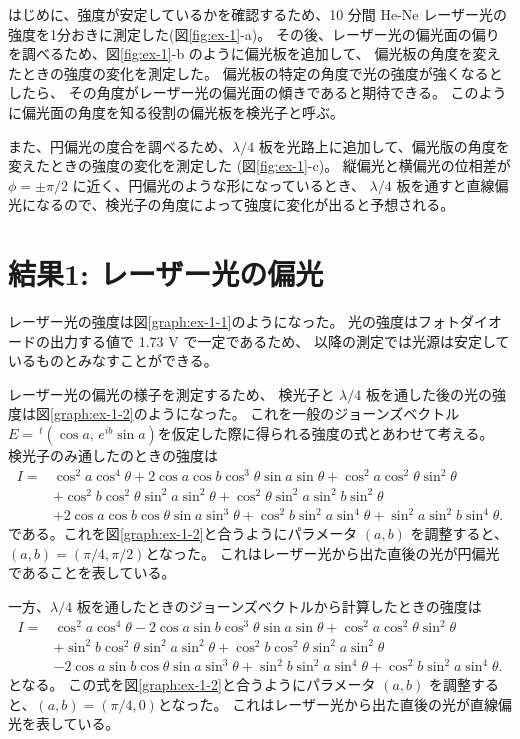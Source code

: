 \documentclass[9pt,dvipdfmx,a4paper]{jsarticle}
\begin{document}
はじめに、強度が安定しているかを確認するため、10 分間 He-Ne レーザー光の強度を1分おきに測定した(図\ref{fig:ex-1}-a)。
その後、レーザー光の偏光面の偏りを調べるため、図\ref{fig:ex-1}-b のように偏光板を追加して、
偏光板の角度を変えたときの強度の変化を測定した。
偏光板の特定の角度で光の強度が強くなるとしたら、
その角度がレーザー光の偏光面の傾きであると期待できる。
このように偏光面の角度を知る役割の偏光板を検光子と呼ぶ。

また、円偏光の度合を調べるため、\(\lambda/4\) 板を光路上に追加して、偏光版の角度を変えたときの強度の変化を測定した
(図\ref{fig:ex-1}-c)。
縦偏光と横偏光の位相差が \(\phi=\pm\pi/2\) に近く、円偏光のような形になっているとき、
\(\lambda/4\) 板を通すと直線偏光になるので、検光子の角度によって強度に変化が出ると予想される。

\section{結果1: レーザー光の偏光}
レーザー光の強度は図\ref{graph:ex-1-1}のようになった。
光の強度はフォトダイオードの出力する値で 1.73 V で一定であるため、
以降の測定では光源は安定しているものとみなすことができる。

レーザー光の偏光の様子を測定するため、
検光子と \(\lambda/4\) 板を通した後の光の強度は図\ref{graph:ex-1-2}のようになった。
これを一般のジョーンズベクトル \(E = \,^t(\cos a,\,e^{ib}\sin a)\)を仮定した際に得られる強度の式とあわせて考える。
検光子のみ通したのときの強度は
\begin{align}
    I = &\cos^2 a \cos^4 \theta
    + 2 \cos a \cos b \cos^3 \theta \sin a \sin \theta
    + \cos^2 a \cos^2 \theta \sin^2 \theta \nonumber \\
    &+ \cos^2 b \cos^2 \theta \sin^2 a \sin^2 \theta
    + \cos^2 \theta \sin^2 a \sin^2 b \sin^2 \theta \nonumber \\
    &+ 2 \cos a \cos b \cos \theta \sin a \sin^3 \theta
    + \cos^2 b \sin^2 a \sin^4 \theta
    + \sin^2 a \sin^2 b \sin^4 \theta.
\end{align}
である。これを図\ref{graph:ex-1-2}と合うようにパラメータ \((a,b)\) を調整すると、\((a,b)=(\pi/4,\pi/2)\)となった。
これはレーザー光から出た直後の光が円偏光であることを表している。

一方、\(\lambda/4\) 板を通したときのジョーンズベクトルから計算したときの強度は
\begin{align}
    I =&\cos^2 a \cos^4 \theta
    - 2 \cos a \sin b \cos^3 \theta \sin a \sin \theta
    + \cos^2 a \cos^2 \theta \sin^2 \theta \nonumber \\
    &+ \sin^2 b \cos^2 \theta \sin^2 a \sin^2 \theta
    + \cos^2 b \cos^2 \theta \sin^2 a \sin^2 \theta \nonumber \\
    &- 2 \cos a \sin b \cos \theta \sin a \sin^3 \theta
    + \sin^2 b \sin^2 a \sin^4 \theta
    + \cos^2 b \sin^2 a \sin^4 \theta.
\end{align}
となる。
この式を図\ref{graph:ex-1-2}と合うようにパラメータ \((a,b)\) を調整すると、\((a,b)=(\pi/4,0)\)となった。
これはレーザー光から出た直後の光が直線偏光を表している。
\end{document}
